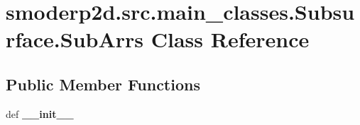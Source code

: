 \hypertarget{classsmoderp2d_1_1src_1_1main__classes_1_1Subsurface_1_1SubArrs}{\section{smoderp2d.\-src.\-main\-\_\-classes.\-Subsurface.\-Sub\-Arrs Class Reference}
\label{classsmoderp2d_1_1src_1_1main__classes_1_1Subsurface_1_1SubArrs}
}
\subsection*{Public Member Functions}
\begin{DoxyCompactItemize}
\item 
\hypertarget{classsmoderp2d_1_1src_1_1main__classes_1_1Subsurface_1_1SubArrs_a469869c54f5c187426f403c6ce1ce878}{def {\bfseries \-\_\-\-\_\-init\-\_\-\-\_\-}}\label{classsmoderp2d_1_1src_1_1main__classes_1_1Subsurface_1_1SubArrs_a469869c54f5c187426f403c6ce1ce878}

\end{DoxyCompactItemize}
